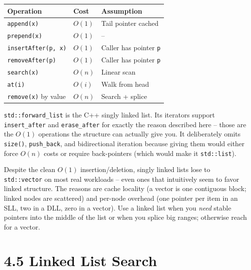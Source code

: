 \documentclass[11pt]{article}
\begin{document}
\begin{center}
\footnotesize
\renewcommand{\arraystretch}{1.3}
\begin{tabular}{@{}lll@{}}
\hline
\textbf{Operation}   & \textbf{Cost}      & \textbf{Assumption} \\
\hline
\texttt{append(x)}        & $O(1)$         & Tail pointer cached \\
\texttt{prepend(x)}       & $O(1)$         & -- \\
\texttt{insertAfter(p, x)} & $O(1)$        & Caller has pointer \texttt{p} \\
\texttt{removeAfter(p)}   & $O(1)$         & Caller has pointer \texttt{p} \\
\texttt{search(x)}        & $O(n)$         & Linear scan \\
\texttt{at(i)}            & $O(i)$         & Walk from head \\
\texttt{remove(x)} by value & $O(n)$       & Search + splice \\
\hline
\end{tabular}
\end{center}

\begin{notebox}
\texttt{std::forward\_list} is the C++ singly linked list. Its
iterators support \texttt{insert\_after} and \texttt{erase\_after}
for exactly the reason described here -- those are the $O(1)$
operations the structure can actually give you. It deliberately
omits \texttt{size()}, \texttt{push\_back}, and bidirectional
iteration because giving them would either force $O(n)$ costs or
require back-pointers (which would make it \texttt{std::list}).
\end{notebox}

\begin{warnbox}
Despite the clean $O(1)$ insertion/deletion, singly linked lists
lose to \texttt{std::vector} on most real workloads -- even ones
that intuitively seem to favor linked structure. The reasons are
cache locality (a vector is one contiguous block; linked nodes are
scattered) and per-node overhead (one pointer per item in an SLL,
two in a DLL, zero in a vector). Use a linked list when you
\emph{need} stable pointers into the middle of the list or when you
splice big ranges; otherwise reach for a vector.
\end{warnbox}

\section{4.5 Linked List Search}
\end{document}
